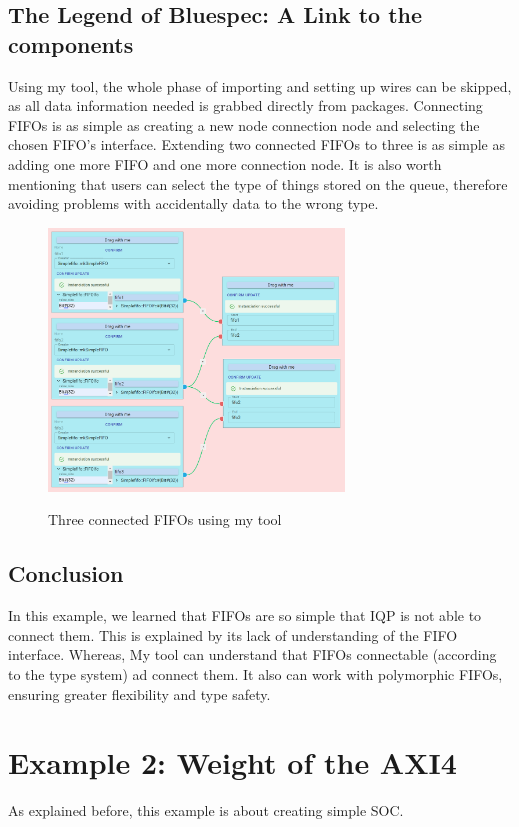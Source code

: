 \documentclass[12pt]{report}
\begin{document}
\subsection{The Legend of Bluespec: A Link to the components} 
Using my tool, the whole phase of importing and setting up wires can be skipped, as all data information needed is grabbed directly from packages. 
Connecting FIFOs is as simple as creating a new node connection node and selecting the chosen FIFO's interface.
Extending two connected FIFOs to three is as simple as adding one more FIFO and one more connection node. 
It is also worth mentioning that users can select the type of things stored on the queue, therefore avoiding problems with accidentally  data to the wrong type. 
\begin{figure}[H] 
    \caption{Three connected FIFOs using my tool} 
    \includegraphics[width=0.7\textwidth]{images/Example1MySolution.png} \\ \centering 
\end{figure} 
\subsection{Conclusion} 
In this example, we learned that FIFOs are so simple that IQP is not able to connect them. This is explained by its lack of understanding of the FIFO interface. 
Whereas, My tool can understand that FIFOs connectable (according to the type system) ad connect them. It also can work with polymorphic FIFOs, ensuring greater flexibility and type safety. 
 
\section{Example 2: Weight of the AXI4} 
As explained before, this example is about creating simple SOC. 
\end{document}
